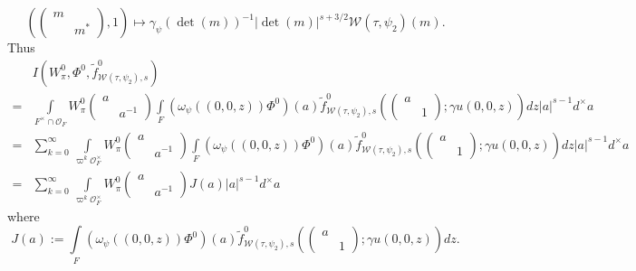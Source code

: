 \documentclass[11pt]{amsart}
\theoremstyle{definition}
\theoremstyle{remark}
\begin{document}
$$
( \left( \begin{smallmatrix} m & \\ & m^* \end{smallmatrix}\right), 1) \mapsto  \gamma_\psi(\det(m))^{-1} |\det(m)|^{s+3/2} \mathcal{W}(\tau, \psi_2)(m).
$$
Thus
\begin{equation}
\begin{split}
&I(W_\pi^0, \Phi^0, \tilde{f}^0_{\mathcal{W}(\tau,\psi_2), s} )\\
=& \int\limits_{F^\times \cap \mathcal{O}_F}  W_\pi^0 \left(\begin{smallmatrix} a&\\ & a^{-1}\end{smallmatrix}\right) \int\limits_{F}  \left( \omega_\psi( (0, 0, z))  \Phi^0\right)(a)       \tilde{f}_{\mathcal{W}(\tau,\psi_2), s} ^0 \left(  \left(\begin{smallmatrix} a &\\&1  \end{smallmatrix}\right) ; \gamma u(0, 0, z)\right)   
  dz   |a|^{s-1} d^\times a  \\
 =& \sum_{k=0}^\infty   \int\limits_{\varpi^k \mathcal{O}_F^\times}  W_\pi^0 \left(\begin{smallmatrix} a&\\ & a^{-1}\end{smallmatrix}\right) \int\limits_{F}   \left(\omega_\psi( (0, 0, z))  \Phi^0\right)(a)       \tilde{f}_{\mathcal{W}(\tau,\psi_2), s} ^0  \left( \left(\begin{smallmatrix} a &\\&1  \end{smallmatrix}\right) ; \gamma u(0, 0, z) \right)   
  dz      |a|^{s-1} d^\times a \\
  =&  \sum_{k=0}^\infty   \int\limits_{\varpi^k \mathcal{O}_F^\times}  W_\pi^0 \left(\begin{smallmatrix} a&\\ & a^{-1}\end{smallmatrix}\right) J(a)    |a|^{s-1} d^\times a
\end{split}
\label{eq-local-zeta-integral-1}
\end{equation}
where 
$$
J(a) := \int\limits_{F}  \left( \omega_\psi( (0, 0, z))  \Phi^0\right)(a)       \tilde{f}_{\mathcal{W}(\tau,\psi_2), s} ^0  \left( \left(\begin{smallmatrix} a &\\&1  \end{smallmatrix}\right) ; \gamma u(0, 0, z)  \right)   
  dz .
$$
\end{document}
